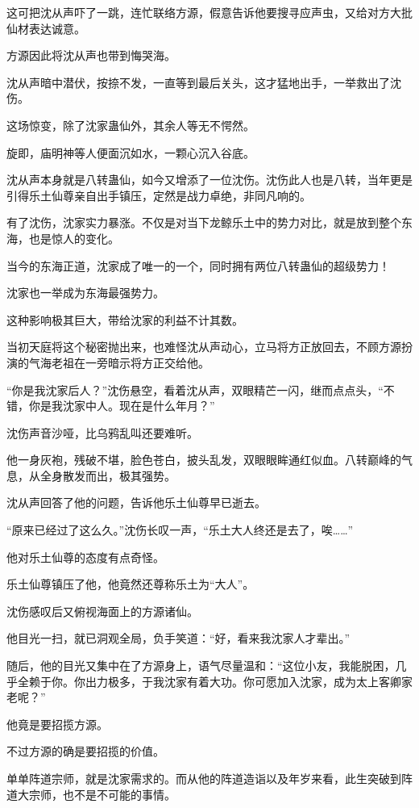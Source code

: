 \begin{this_body}
这可把沈从声吓了一跳，连忙联络方源，假意告诉他要搜寻应声虫，又给对方大批仙材表达诚意。

方源因此将沈从声也带到悔哭海。

沈从声暗中潜伏，按捺不发，一直等到最后关头，这才猛地出手，一举救出了沈伤。

这场惊变，除了沈家蛊仙外，其余人等无不愕然。

旋即，庙明神等人便面沉如水，一颗心沉入谷底。

沈从声本身就是八转蛊仙，如今又增添了一位沈伤。沈伤此人也是八转，当年更是引得乐土仙尊亲自出手镇压，定然是战力卓绝，非同凡响的。

有了沈伤，沈家实力暴涨。不仅是对当下龙鲸乐土中的势力对比，就是放到整个东海，也是惊人的变化。

当今的东海正道，沈家成了唯一的一个，同时拥有两位八转蛊仙的超级势力！

沈家也一举成为东海最强势力。

这种影响极其巨大，带给沈家的利益不计其数。

当初天庭将这个秘密抛出来，也难怪沈从声动心，立马将方正放回去，不顾方源扮演的气海老祖在一旁暗示将方正交给他。

“你是我沈家后人？”沈伤悬空，看着沈从声，双眼精芒一闪，继而点点头，“不错，你是我沈家中人。现在是什么年月？”

沈伤声音沙哑，比乌鸦乱叫还要难听。

他一身灰袍，残破不堪，脸色苍白，披头乱发，双眼眼眸通红似血。八转巅峰的气息，从全身散发而出，极其强势。

沈从声回答了他的问题，告诉他乐土仙尊早已逝去。

“原来已经过了这么久。”沈伤长叹一声，“乐土大人终还是去了，唉……”

他对乐土仙尊的态度有点奇怪。

乐土仙尊镇压了他，他竟然还尊称乐土为“大人”。

沈伤感叹后又俯视海面上的方源诸仙。

他目光一扫，就已洞观全局，负手笑道：“好，看来我沈家人才辈出。”

随后，他的目光又集中在了方源身上，语气尽量温和：“这位小友，我能脱困，几乎全赖于你。你出力极多，于我沈家有着大功。你可愿加入沈家，成为太上客卿家老呢？”

他竟是要招揽方源。

不过方源的确是要招揽的价值。

单单阵道宗师，就是沈家需求的。而从他的阵道造诣以及年岁来看，此生突破到阵道大宗师，也不是不可能的事情。


\end{this_body}
